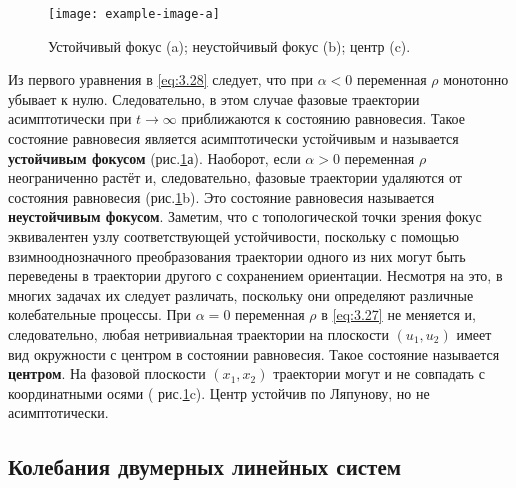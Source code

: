 \begin{figure}[h!]
        \centering
        \texttt{[image: example-image-a]}
        \label{fig:3.7}
        \caption{Устойчивый фокус (a); неустойчивый фокус (b); центр (c).}
\end{figure}
Из первого уравнения в \eqref{eq:3.28} следует, что при $ \alpha < 0$ переменная $\rho$ монотонно убывает к нулю. Следовательно, в этом случае фазовые траектории асимптотически при $t \to \infty$ приближаются к состоянию равновесия. Такое состояние равновесия является асимптотически устойчивым и называется \textbf{ устойчивым фокусом} (рис.\ref{fig:3.7}а). Наоборот, 
если $ \alpha > 0 $ переменная $\rho$ неограниченно растёт и, следовательно, фазовые траектории удаляются от состояния равновесия (рис.\ref{fig:3.7}b).  Это состояние равновесия называется \textbf{неустойчивым фокусом}.
Заметим, что с топологической точки зрения фокус эквивалентен узлу соответствующей устойчивости, поскольку с помощью взимнооднозначного преобразования траектории одного из них могут быть переведены в траектории другого с сохранением ориентации. Несмотря на это, в многих задачах их следует различать, поскольку они определяют различные колебательные процессы. При $\alpha = 0$ переменная $\rho$ в \eqref{eq:3.27}  не меняется и, следовательно, любая нетривиальная траектории на плоскости $(u_1, u_2)$ имеет вид окружности с центром в состоянии равновесия. Такое состояние называется \textbf{центром}. На фазовой плоскости $(x_1,x_2)$ траектории могут и не совпадать с координатными осями ( рис.\ref{fig:3.7}c). Центр устойчив по Ляпунову, но не асимптотически.

\subsection{Колебания двумерных линейных систем}%
\label{ssub:3.2.3}

